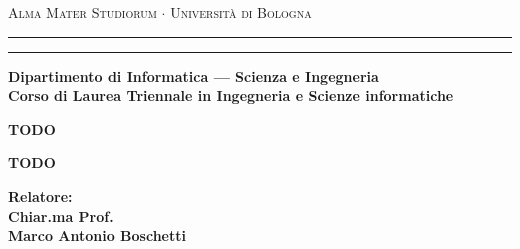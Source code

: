 \documentclass[12pt,a4paper,twoside]{report}
\begin{document}
	\begin{titlepage}
		\begin{center}
			
			{{\Large{\textsc{Alma Mater Studiorum $\cdot$ Universit\`a di
							Bologna}}}} \rule[0.1cm]{15.8cm}{0.1mm}
			\rule[0.5cm]{15.8cm}{0.6mm}
			
			{\small{\bf Dipartimento di Informatica --- Scienza e Ingegneria\\
					Corso di Laurea Triennale in Ingegneria e Scienze informatiche}}
		\end{center}
		
		\vspace{15mm}
		\begin{center}
			{\LARGE{\bf TODO}}\\
			\vspace{3mm}
			
			\vspace{19mm}
			{\large{\bf TODO}}
		\end{center}
		
		\vspace{30mm}
		\par
		\noindent
		\begin{minipage}[t]{0.50\textwidth}
			{\large{\bf Relatore:\\
					Chiar.ma Prof.\\
					Marco Antonio Boschetti}} \\[5mm]
			

\end{minipage}
\end{titlepage}
\end{document}
